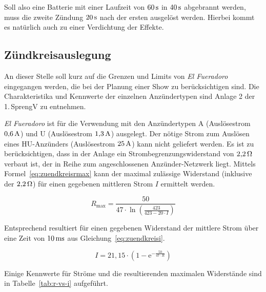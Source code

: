 \documentclass[pdftex, parskip, numbers=noenddot, toc=listof]{scrbook}
\newcommand{\anlage}{\emph{El Fueradoro}}
\begin{document}
				Soll also eine Batterie mit einer Laufzeit von $\unit[60]{s}$ in $\unit[40]{s}$ abgebrannt werden, muss die zweite Zündung $\unit[20]{s}$ nach der ersten ausgelöst werden. Hierbei kommt es natürlich auch zu einer Verdichtung der Effekte.

			\subsection{Zündkreisauslegung}

				An dieser Stelle soll kurz auf die Grenzen und Limits von {\anlage} eingegangen werden, die bei der Planung einer Show zu berücksichtigen sind. Die Charakteristika und Kennwerte der einzelnen Anzündertypen sind Anlage 2 der 1.\,SprengV zu entnehmen.

				{\anlage} ist für die Verwendung mit den Anzündertypen A (Auslösestrom $\unit[0{,}6]{A}$) und U (Auslösestrom $\unit[1{,}3]{A}$) ausgelegt. Der nötige Strom zum Auslösen eines HU-Anzünders (Auslösestrom $\unit[25]{A}$) kann nicht geliefert werden. Es ist zu berücksichtigen, dass in der Anlage ein Strombegrenzungswiderstand von $\unit[2{,}2]{\Omega}$ verbaut ist, der in Reihe zum angeschlossenen Anzünder-Netzwerk liegt. Mittels Formel~\eqref{eq:zuendkreisrmax} kann der maximal zulässige Widerstand (inklusive der $\unit[2{,}2]{\Omega}$) für einen gegebenen mittleren Strom $I$ ermittelt werden.

				\begin{equation}
					R_\text{max} = \frac{50}{47 {\cdot} \ln\left(\frac{423}{423 - 20 {\cdot} I}\right)}
					\label{eq:zuendkreisrmax}
				\end{equation}

				Entsprechend resultiert für einen gegebenen Widerstand der mittlere Strom über eine Zeit von $\unit[10]{ms}$ aus Gleichung~\eqref{eq:zuendkreisi}.

				\begin{equation}
					I = 21{,}15  {\cdot} \left(1 - \mathrm{e}^{-\frac{50}{47 {\cdot} R}}\right)
					\label{eq:zuendkreisi}
				\end{equation}

				Einige Kennwerte für Ströme und die resultierenden maximalen Widerstände sind in Tabelle~\ref{tab:r-vs-i} aufgeführt.
\end{document}
